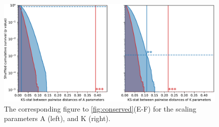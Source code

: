 \begin{figure}[tbp] 
  \centering
  \includegraphics[width=174mm]{figures/supplemental/sfig03-psyc-conserved-stats-AK.pdf}
  \caption[Parameters A and K are conserved within subject.]
{The corresponding figure to \ref{fig:conserved}(E-F) for the scaling parameters A (left), and K (right).
}
  \label{fig:AKconserved}
\end{figure}